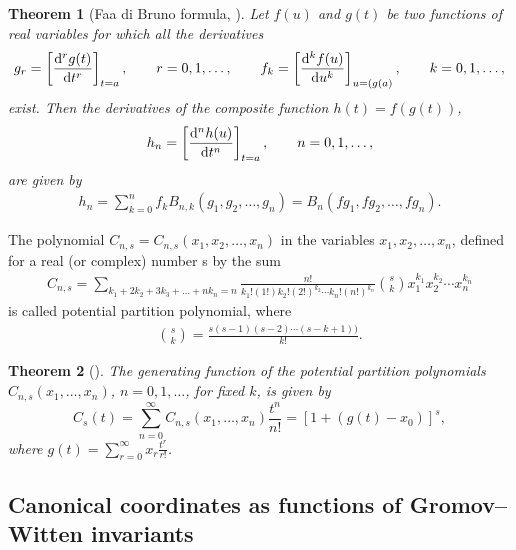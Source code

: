 \documentclass[pdftex]{sigma}
\numberwithin{equation}{section}
\newtheorem{Theorem}{Theorem}[section]
\begin{document}
\begin{Theorem}[Faa di Bruno formula, \cite{Charalambides}]
Let $f(u)$ and $g(t)$ be two functions of real variables for which all the derivatives
\begin{gather*}
g_r=\left[\frac{{\rm d}^rg(t)}{{\rm d}t^r}\right]_{t=a}, \qquad r=0,1,\dots, \qquad f_k=\left[\frac{{\rm d}^kf(u)}{{\rm d}u^k}\right]_{u=(g(a)}, \qquad k=0,1,\dots,
\end{gather*}
exist. Then the derivatives of the composite function $h(t)= f(g(t))$,
\begin{gather*}
h_n=\left[\frac{{\rm d}^nh(u)}{{\rm d}t^n}\right]_{t=a}, \qquad n=0,1,\dots,
\end{gather*}
are given by
\begin{gather}
h_n=\sum_{k=0}^n f_kB_{n,k}(g_1,g_2,\dots,g_n)=B_n(fg_1,fg_2,\dots,fg_n).\label{Faa di Bruno}
\end{gather}
\end{Theorem}


\begin{Definition}
The polynomial $C_{n,s}=C_{n,s}(x_1,x_2,\dots,x_n)$ in the variables $x_1,x_2,\dots,\allowbreak x_n$, defined for a real (or complex) number s by the sum
\begin{gather*}
C_{n,s}=\sum_{ k_1+2k_2+3k_3+\dots +nk_{n}=n} \frac{n!}{k_1!(1!)k_2!(2!)^{k_2}\cdots k_n!(n!)^{k_n}}{{s}\choose{k}} x_1^{k_1}x_2^{k_2}\cdots x_n^{k_n}
\end{gather*}
 is called potential partition polynomial,
 where
 \begin{gather*}
 {{s}\choose{k}}=\frac{s(s-1)(s-2)\cdots (s-k+1))}{k!}.
 \end{gather*}
\end{Definition}


\begin{Theorem}[\cite{Charalambides}]\label{theorem potential partition polynomials}
The generating function of the potential partition polynomials $C_{n,s}(x_1,\dots,\allowbreak x_n)$, $n=0,1,\dots$, for fixed $k$, is given by
 \[%
C_{s}(t)=\sum_{n=0}^{\infty} C_{n,s}(x_1,\dots, x_n)\frac{t^n}{n!}=[ 1+(g(t)-x_0) ]^s ,
\]
where
$g(t)=\sum_{r=0}^{\infty} x_r \frac{t^r}{r!}$.
\end{Theorem}

\subsection{Canonical coordinates as functions of Gromov--Witten invariants}\label{Canonical coordinates as functions of Gromov Witten invariants}
\end{document}
